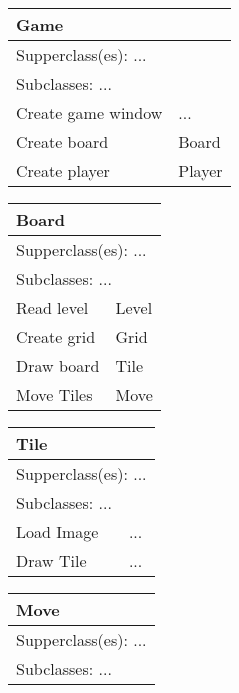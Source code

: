 
\begin{figure}[H]
\begin{subfigure}{}
		\begin{tabular}{|p{1in}|p{1in}|}
			\hline
			\multicolumn{2}{|p{2in}|}{\textbf{Game}} \\ \hline
			\multicolumn{2}{|p{2in}|}{Supperclass(es): ...} \\ \hline
			\multicolumn{2}{|p{2in}|}{Subclasses: ...} \\ \hline
			Create game window	& ... \\ \hline
			Create board & Board \\ \hline
			Create player & Player \\ \hline
		\end{tabular}
		\begin{tabular}{|p{1in}|p{1in}|}
			\hline
			\multicolumn{2}{|p{2in}|}{\textbf{Board}} \\ \hline
			\multicolumn{2}{|p{2in}|}{Supperclass(es): ...} \\ \hline
			\multicolumn{2}{|p{2in}|}{Subclasses: ...} \\ \hline
			Read level & Level \\ \hline
			Create grid & Grid \\ \hline
			Draw board & Tile \\ \hline
			Move Tiles & Move \\ \hline
		\end{tabular}
\end{subfigure}
\begin{subfigure}{}
		\begin{tabular}{|p{1in}|p{1in}|}
			\hline
			\multicolumn{2}{|p{2in}|}{\textbf{Tile}} \\ \hline
			\multicolumn{2}{|p{2in}|}{Supperclass(es): ...} \\ \hline
			\multicolumn{2}{|p{2in}|}{Subclasses: ...} \\ \hline
			Load Image & ... \\ \hline
			Draw Tile & ... \\ \hline
		\end{tabular}
		\begin{tabular}{|p{1in}|p{1in}|}
			\hline
			\multicolumn{2}{|p{2in}|}{\textbf{Move}} \\ \hline
			\multicolumn{2}{|p{2in}|}{Supperclass(es): ...} \\ \hline
			\multicolumn{2}{|p{2in}|}{Subclasses: ...} \\ \hline

\end{tabular}
\end{subfigure}
\end{figure}
